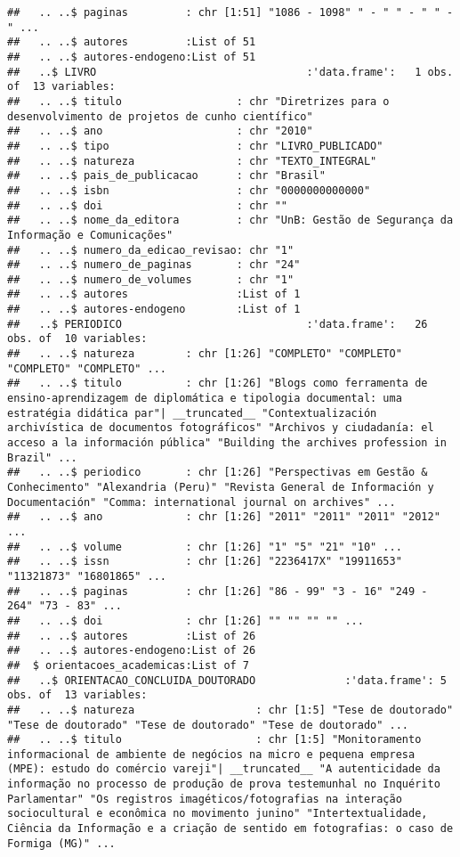 \documentclass[]{article}
\begin{document}
\begin{verbatim}
##   .. ..$ paginas         : chr [1:51] "1086 - 1098" " - " " - " " - " ...
##   .. ..$ autores         :List of 51
##   .. ..$ autores-endogeno:List of 51
##   ..$ LIVRO                                 :'data.frame':   1 obs. of  13 variables:
##   .. ..$ titulo                  : chr "Diretrizes para o desenvolvimento de projetos de cunho científico"
##   .. ..$ ano                     : chr "2010"
##   .. ..$ tipo                    : chr "LIVRO_PUBLICADO"
##   .. ..$ natureza                : chr "TEXTO_INTEGRAL"
##   .. ..$ pais_de_publicacao      : chr "Brasil"
##   .. ..$ isbn                    : chr "0000000000000"
##   .. ..$ doi                     : chr ""
##   .. ..$ nome_da_editora         : chr "UnB: Gestão de Segurança da Informação e Comunicações"
##   .. ..$ numero_da_edicao_revisao: chr "1"
##   .. ..$ numero_de_paginas       : chr "24"
##   .. ..$ numero_de_volumes       : chr "1"
##   .. ..$ autores                 :List of 1
##   .. ..$ autores-endogeno        :List of 1
##   ..$ PERIODICO                             :'data.frame':   26 obs. of  10 variables:
##   .. ..$ natureza        : chr [1:26] "COMPLETO" "COMPLETO" "COMPLETO" "COMPLETO" ...
##   .. ..$ titulo          : chr [1:26] "Blogs como ferramenta de ensino-aprendizagem de diplomática e tipologia documental: uma estratégia didática par"| __truncated__ "Contextualización archivística de documentos fotográficos" "Archivos y ciudadanía: el acceso a la información pública" "Building the archives profession in Brazil" ...
##   .. ..$ periodico       : chr [1:26] "Perspectivas em Gestão & Conhecimento" "Alexandria (Peru)" "Revista General de Información y Documentación" "Comma: international journal on archives" ...
##   .. ..$ ano             : chr [1:26] "2011" "2011" "2011" "2012" ...
##   .. ..$ volume          : chr [1:26] "1" "5" "21" "10" ...
##   .. ..$ issn            : chr [1:26] "2236417X" "19911653" "11321873" "16801865" ...
##   .. ..$ paginas         : chr [1:26] "86 - 99" "3 - 16" "249 - 264" "73 - 83" ...
##   .. ..$ doi             : chr [1:26] "" "" "" "" ...
##   .. ..$ autores         :List of 26
##   .. ..$ autores-endogeno:List of 26
##  $ orientacoes_academicas:List of 7
##   ..$ ORIENTACAO_CONCLUIDA_DOUTORADO              :'data.frame': 5 obs. of  13 variables:
##   .. ..$ natureza                   : chr [1:5] "Tese de doutorado" "Tese de doutorado" "Tese de doutorado" "Tese de doutorado" ...
##   .. ..$ titulo                     : chr [1:5] "Monitoramento informacional de ambiente de negócios na micro e pequena empresa (MPE): estudo do comércio vareji"| __truncated__ "A autenticidade da informação no processo de produção de prova testemunhal no Inquérito Parlamentar" "Os registros imagéticos/fotografias na interação sociocultural e econômica no movimento junino" "Intertextualidade, Ciência da Informação e a criação de sentido em fotografias: o caso de Formiga (MG)" ...

\end{verbatim}
\end{document}
